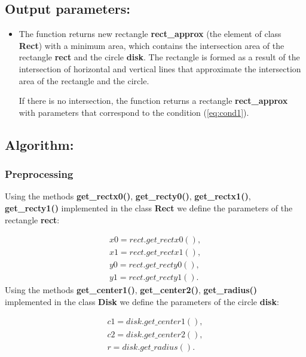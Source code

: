 \documentclass{report}
\begin{document}
	\subsection*{Output parameters:}
	
	\begin{itemize}
		\item The function returns new rectangle {\bfseries rect\_approx} (the element of class {\bfseries Rect}) with a minimum area, which contains the intersection area of the rectangle {\bfseries rect} and the circle {\bfseries disk}. The rectangle is formed as a result of the intersection of horizontal and vertical lines that approximate the intersection area of the rectangle and the circle.
		
		If there is no intersection, the function returns a rectangle {\bfseries rect\_approx} with parameters that correspond to the condition (\ref{eq:cond1}).

	\end{itemize}

	\subsection*{Algorithm:}
	
	\subsubsection*{Preprocessing}
	
	Using the methods  {\bfseries get\_rectx0()}, {\bfseries get\_recty0()}, {\bfseries get\_rectx1()}, {\bfseries get\_recty1()} implemented in the class {\bfseries Rect} we define the parameters of the rectangle {\bfseries rect}:
	
	\begin{equation}
		\begin{gathered}	
			x0 = rect.get\_rectx0(),\\
			x1 = rect.get\_rectx1(),\\
			y0 = rect.get\_recty0(),\\
			y1 = rect.get\_recty1().
		\end{gathered}
	\end{equation}
	Using the methods {\bfseries get\_center1()}, {\bfseries get\_center2()}, {\bfseries get\_radius()} implemented in the class {\bfseries Disk} we define the parameters of the circle {\bfseries disk}:
		
	\begin{equation}
		\begin{gathered}
			c1 = disk.get\_center1(),\\
			c2 = disk.get\_center2(),\\
			r = disk.get\_radius().
		\end{gathered}
	\end{equation}
\end{document}
